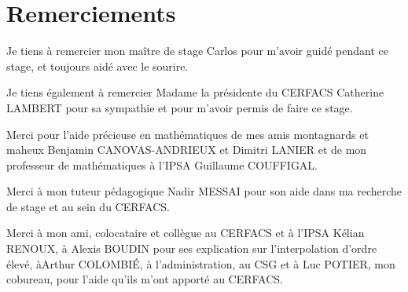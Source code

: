 \chapter*{Remerciements}

Je tiens à remercier mon maître de stage Carlos pour m'avoir guidé pendant
ce stage, et toujours aidé avec le sourire.

Je tiens également à remercier Madame la présidente du CERFACS Catherine LAMBERT
pour sa sympathie et pour m'avoir permis de faire ce stage.

Merci pour l'aide précieuse en mathématiques de mes amis montagnards et maheux Benjamin
CANOVAS-ANDRIEUX et Dimitri LANIER et de mon professeur de mathématiques à l'IPSA Guillaume COUFFIGAL.

Merci à mon tuteur pédagogique Nadir MESSAI pour son aide dans ma recherche de stage et au sein du CERFACS.

Merci à mon ami, colocataire et collègue au CERFACS et à l'IPSA Kélian RENOUX, à Alexis BOUDIN pour ses explication sur l'interpolation d'ordre élevé, àArthur COLOMBIÉ, à l'administration, au CSG et à Luc POTIER, mon
cobureau, pour l'aide qu'ils m'ont apporté au CERFACS.
